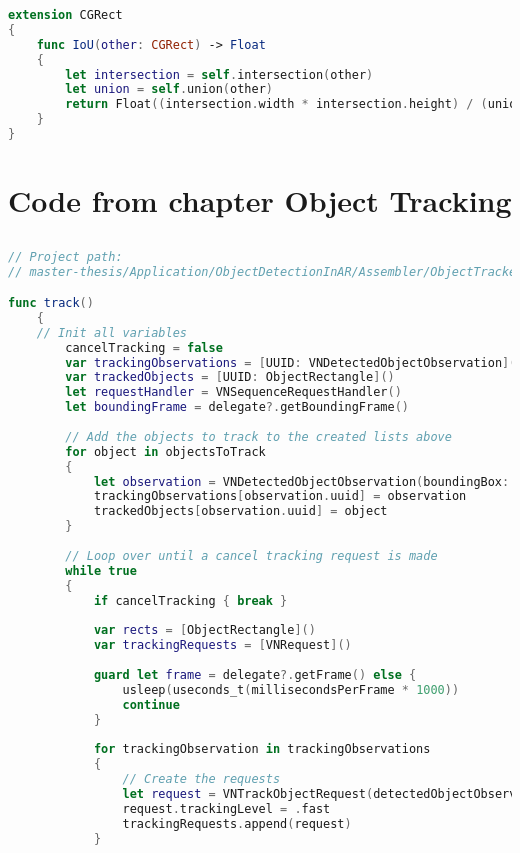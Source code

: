 \begin{appendices}
\begin{lstlisting}[language=swift]
    extension CGRect
{
    func IoU(other: CGRect) -> Float
    {
        let intersection = self.intersection(other)
        let union = self.union(other)
        return Float((intersection.width * intersection.height) / (union.width * union.height))
    }
}
\end{lstlisting}


\chapter{Code from chapter Object Tracking}
\section{}

\begin{lstlisting}[language=swift]
// Project path:
// master-thesis/Application/ObjectDetectionInAR/Assembler/ObjectTracker.swift

func track()
    {
    // Init all variables
        cancelTracking = false
        var trackingObservations = [UUID: VNDetectedObjectObservation]()
        var trackedObjects = [UUID: ObjectRectangle]()
        let requestHandler = VNSequenceRequestHandler()
        let boundingFrame = delegate?.getBoundingFrame()
        
        // Add the objects to track to the created lists above
        for object in objectsToTrack
        {
            let observation = VNDetectedObjectObservation(boundingBox: object.getNormalizedRect(frame: viewFrame))
            trackingObservations[observation.uuid] = observation
            trackedObjects[observation.uuid] = object
        }
        
        // Loop over until a cancel tracking request is made
        while true
        {
            if cancelTracking { break }
            
            var rects = [ObjectRectangle]()
            var trackingRequests = [VNRequest]()
            
            guard let frame = delegate?.getFrame() else {
                usleep(useconds_t(millisecondsPerFrame * 1000))
                continue
            }
            
            for trackingObservation in trackingObservations
            {
                // Create the requests
                let request = VNTrackObjectRequest(detectedObjectObservation: trackingObservation.value)
                request.trackingLevel = .fast
                trackingRequests.append(request)
            }


\end{lstlisting}
\end{appendices}
